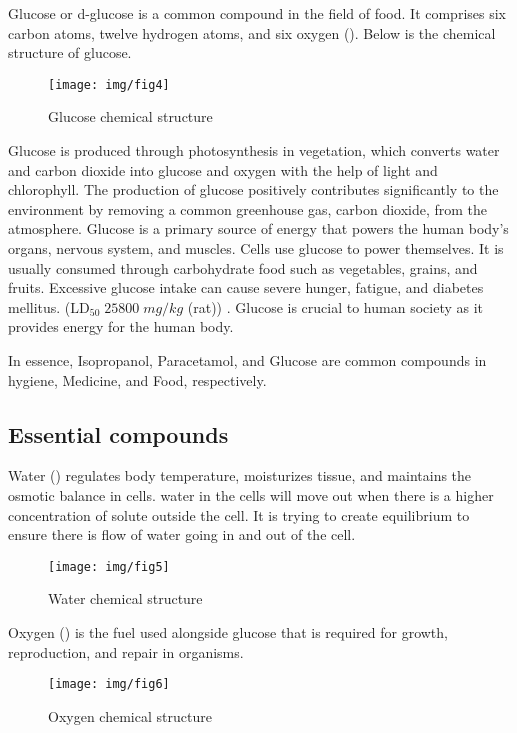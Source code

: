 \documentclass{article}
\begin{document}
Glucose or d-glucose is a common compound in the field of food.  It comprises six carbon atoms, twelve hydrogen atoms, and six oxygen (). Below is the chemical structure of glucose.
 
\begin{figure}[htbp]
    \center
    \texttt{[image: img/fig4]}
    \caption{Glucose chemical structure}
\end{figure}
 
Glucose is produced through photosynthesis in vegetation, which converts water and carbon dioxide into glucose and oxygen with the help of light and chlorophyll. The production of glucose positively contributes significantly to the environment by removing a common greenhouse gas, carbon dioxide, from the atmosphere. Glucose is a primary source of energy that powers the human body’s organs, nervous system, and muscles. Cells use glucose to power themselves. It is usually consumed through carbohydrate food such as vegetables, grains, and fruits. Excessive glucose intake can cause severe hunger, fatigue, and diabetes mellitus. ($\text{LD}_{50}\; 25800\; mg/kg$ (rat)) \cite{cite10}. Glucose is crucial to human society as it provides energy for the human body. 
 
In essence, Isopropanol, Paracetamol, and Glucose are common compounds in hygiene, Medicine, and Food, respectively. 
 
\newpage
 
\subsection{Essential compounds}
Water () regulates body temperature, moisturizes tissue, and maintains the osmotic balance in cells. water in the cells will move out when there is a higher concentration of solute outside the cell. It is trying to create equilibrium to ensure there is flow of water going in and out of the cell. 
 
\begin{figure}[htbp]
    \center
    \texttt{[image: img/fig5]}
    \caption{Water chemical structure}
\end{figure}
 
 
Oxygen () is the fuel used alongside glucose that is required for growth, reproduction, and repair in organisms. 
 
\begin{figure}[htbp]
    \center
    \texttt{[image: img/fig6]}
    \caption{Oxygen chemical structure}
\end{figure}
 
\end{document}
